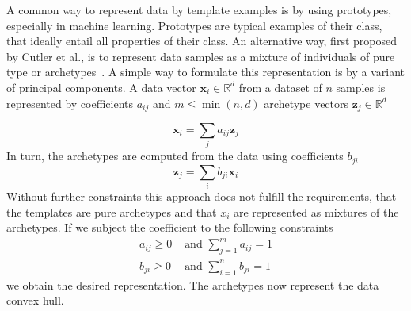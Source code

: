 A common way to represent data by template examples is by using prototypes,
especially in machine learning. Prototypes are typical examples of their class,
that ideally entail all properties of their class. An alternative way, first
proposed by Cutler et al., is to represent data samples as a mixture of
individuals of pure type or archetypes~\citep{cutlerArchetypalAnalysis1994}. A
simple way to formulate this representation is by a variant of principal
components. A data vector $\mathbf{x}_i \in \mathbb{R}^d$ from a dataset of $n$
samples is represented by coefficients $a_{ij}$ and $m \leq \min(n, d)$
archetype vectors $\mathbf{z}_j \in \mathbb{R}^d$

\begin{equation}%
    \label{eq:data_from_archetypes}
    \mathbf{x}_i = \sum_j a_{ij} \mathbf{z}_j
\end{equation}
In turn, the archetypes are computed from the data using coefficients $b_{ji}$
\begin{equation}%
    \label{eq:archetypes_from_data}
    \mathbf{z}_j = \sum_i b_{ji} \mathbf{x}_i
\end{equation}
Without further constraints this approach does not fulfill the requirements,
that the templates are pure archetypes and that $x_i$ are represented as
mixtures of the archetypes. If we subject the coefficient to the following
constraints
\begin{equation}
    \begin{aligned}%
        \label{eq:archetype_constraints}
        a_{ij} \geq 0 &\textrm{ and } \sum_{j=1}^{m} a_{ij} = 1 \\
        b_{ji} \geq 0 &\textrm{ and } \sum_{i=1}^{n} b_{ji} = 1
    \end{aligned}   
\end{equation}
we obtain the desired representation. The archetypes now represent the data
convex hull.

